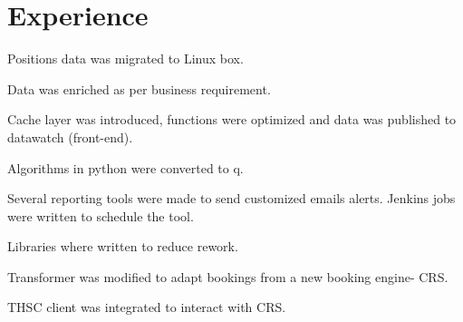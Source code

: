 \documentclass[]{deedy-resume-openfont}
\begin{document}
%
%


%
%



\begin{center}
\huge\color{subheadings}
\end{center}

\section{Experience}
\runsubsection{}
\vspace{\topsep} %

\begin{tightemize}
\item Positions data was migrated to Linux box.
\item Data was enriched as per business requirement.
\item Cache layer was introduced, functions were optimized and data was published to datawatch (front-end).
\end{tightemize}
\sectionsep


\begin{tightemize}
\item Algorithms in python were converted to q.
\item Several reporting tools were made to send customized emails alerts. Jenkins jobs were written to schedule the tool.
\item Libraries where written to reduce rework.
\end{tightemize}
\sectionsep

\runsubsection{}
\vspace{\topsep} %

\begin{tightemize}
\item Transformer was modified to adapt bookings from a new booking engine- CRS.
\item THSC client was integrated to interact with CRS. 
\end{tightemize}
\end{document}

